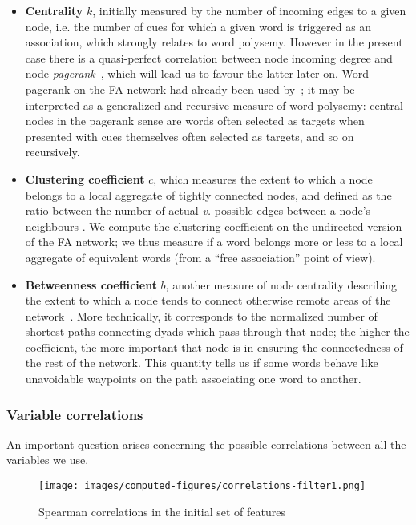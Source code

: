 \begin{itemize}
    \item \textbf{Centrality} $k$, initially measured by the number of incoming edges to a given node, i.e. the number of cues for which a given word is triggered as an association, which strongly relates to word polysemy.
    However in the present case there is a quasi-perfect correlation between node incoming degree and node \emph{pagerank}~\citep{Page99}, which will lead us to favour the latter later on. Word pagerank on the FA network had already been used by~\citet{Griffiths07}; it may be interpreted as a generalized and recursive measure of word polysemy: central nodes in the pagerank sense are words often selected as targets when presented with cues themselves often selected as targets, and so on recursively.
    \item \textbf{Clustering coefficient} $c$, which measures the extent to which a node belongs to a local aggregate of tightly connected nodes, and defined as the ratio between the number of actual \emph{v.} possible edges between a node's neighbours \cite{watt-coll}.
    We compute the clustering coefficient on the undirected version of the FA network; we thus measure if a word belongs more or less to a local aggregate of equivalent words (from a ``free association'' point of view).
    \item \textbf{Betweenness coefficient} $b$, another measure of node centrality describing the extent to which a node tends to connect otherwise remote areas of the network~\citep{free:set}.
    More technically, it corresponds to the normalized number of shortest paths connecting dyads which pass through that node; the higher the coefficient, the more important that node is in ensuring the connectedness of the rest of the network.
    This quantity tells us if some words behave like unavoidable waypoints on the path associating one word to another.
\end{itemize}

\subsubsection{Variable correlations}

An important question arises concerning the possible correlations between all the variables we use.

\begin{figure}[!th]
    \centering
    \texttt{[image: images/computed-figures/correlations-filter1.png]}
    \caption{Spearman correlations in the initial set of features}
    \label{fig:feature-corrs-initial}
\end{figure}

